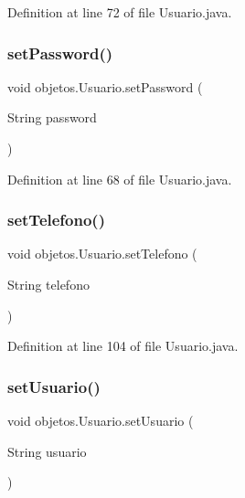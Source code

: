 Definition at line 72 of file Usuario.\+java.

\mbox{\label{classobjetos_1_1_usuario_acebc98a73bf17db1fb88e476e64f2c6c}} 
\subsubsection{\texorpdfstring{set\+Password()}{setPassword()}}
{\footnotesize\ttfamily void objetos.\+Usuario.\+set\+Password (\begin{DoxyParamCaption}\item[{String}]{password }\end{DoxyParamCaption})}



Definition at line 68 of file Usuario.\+java.

\mbox{\label{classobjetos_1_1_usuario_a0ff938bea2a54afe1c1692e8944010e7}} 
\subsubsection{\texorpdfstring{set\+Telefono()}{setTelefono()}}
{\footnotesize\ttfamily void objetos.\+Usuario.\+set\+Telefono (\begin{DoxyParamCaption}\item[{String}]{telefono }\end{DoxyParamCaption})}



Definition at line 104 of file Usuario.\+java.

\mbox{\label{classobjetos_1_1_usuario_a7be3dc8fe52e00029ec3a6ec763116e1}} 
\subsubsection{\texorpdfstring{set\+Usuario()}{setUsuario()}}
{\footnotesize\ttfamily void objetos.\+Usuario.\+set\+Usuario (\begin{DoxyParamCaption}\item[{String}]{usuario }\end{DoxyParamCaption})}



